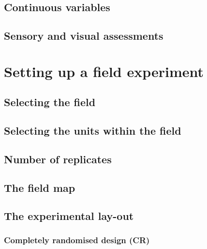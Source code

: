 \documentclass[a4paper,12pt,oneside]{book}
\begin{document}
\hypertarget{continuous-variables}{%
\subsection{Continuous variables}\label{continuous-variables}}

\hypertarget{sensory-and-visual-assessments}{%
\subsection{Sensory and visual assessments}\label{sensory-and-visual-assessments}}

\hypertarget{setting-up-a-field-experiment}{%
\section{Setting up a field experiment}\label{setting-up-a-field-experiment}}

\hypertarget{selecting-the-field}{%
\subsection{Selecting the field}\label{selecting-the-field}}

\hypertarget{selecting-the-units-within-the-field}{%
\subsection{Selecting the units within the field}\label{selecting-the-units-within-the-field}}

\hypertarget{number-of-replicates}{%
\subsection{Number of replicates}\label{number-of-replicates}}

\hypertarget{the-field-map}{%
\subsection{The field map}\label{the-field-map}}

\hypertarget{the-experimental-lay-out}{%
\subsection{The experimental lay-out}\label{the-experimental-lay-out}}

\hypertarget{completely-randomised-design-cr}{%
\subsubsection{Completely randomised design (CR)}\label{completely-randomised-design-cr}}
\end{document}
